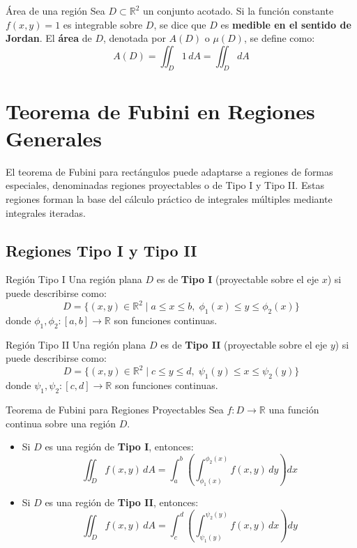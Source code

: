 \documentclass[11pt,a4paper]{article}
\begin{document}
\begin{definicionbox}{Área de una región}{}
    Sea $D \subset \mathbb{R}^2$ un conjunto acotado. Si la función constante $f(x,y) = 1$ es integrable sobre $D$, se dice que $D$ es \textbf{medible en el sentido de Jordan}. El \textbf{área} de $D$, denotada por $A(D)$ o $\mu(D)$, se define como:
    \[
    A(D) = \iint_D 1 \, dA = \iint_D dA
    \]
\end{definicionbox}

\section{Teorema de Fubini en Regiones Generales}

El teorema de Fubini para rectángulos puede adaptarse a regiones de formas especiales, denominadas regiones proyectables o de Tipo I y Tipo II. Estas regiones forman la base del cálculo práctico de integrales múltiples mediante integrales iteradas.

\subsection{Regiones Tipo I y Tipo II}

\begin{definicionbox}{Región Tipo I}{}
    Una región plana $D$ es de \textbf{Tipo I} (proyectable sobre el eje $x$) si puede describirse como:
    \[
    D = \{ (x,y) \in \mathbb{R}^2 \mid a \leq x \leq b, \; \phi_1(x) \leq y \leq \phi_2(x) \}
    \]
    donde $\phi_1, \phi_2 : [a,b] \to \mathbb{R}$ son funciones continuas.
\end{definicionbox}

\begin{definicionbox}{Región Tipo II}{}
    Una región plana $D$ es de \textbf{Tipo II} (proyectable sobre el eje $y$) si puede describirse como:
    \[
    D = \{ (x,y) \in \mathbb{R}^2 \mid c \leq y \leq d, \; \psi_1(y) \leq x \leq \psi_2(y) \}
    \]
    donde $\psi_1, \psi_2 : [c,d] \to \mathbb{R}$ son funciones continuas.
\end{definicionbox}

\begin{teoremabox}{Teorema de Fubini para Regiones Proyectables}{}
    Sea $f: D \to \mathbb{R}$ una función continua sobre una región $D$.
    \begin{itemize}
        \item[(i)] Si $D$ es una región de \textbf{Tipo I}, entonces:
        \[
        \iint_D f(x,y) \, dA = \int_a^b \left( \int_{\phi_1(x)}^{\phi_2(x)} f(x,y) \, dy \right) dx
        \]
        \item[(ii)] Si $D$ es una región de \textbf{Tipo II}, entonces:
        \[
        \iint_D f(x,y) \, dA = \int_c^d \left( \int_{\psi_1(y)}^{\psi_2(y)} f(x,y) \, dx \right) dy
        \]
    \end{itemize}
\end{teoremabox}
\end{document}
